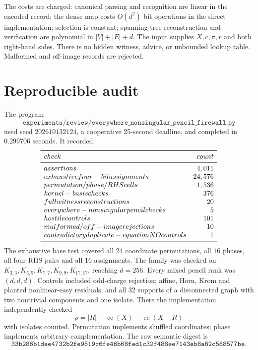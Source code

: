 \documentclass[11pt]{article}
\begin{document}
The costs are charged: canonical parsing and recognition are linear in the
encoded record; the dense map costs \(O(d^2)\) bit operations in the direct
implementation; selection is constant; spanning-tree reconstruction and
verification are polynomial in \(|V|+|E|+d\).  The input supplies
\(X,c,\pi,r\) and both right-hand sides.  There is no hidden witness, advice,
or unbounded lookup table.  Malformed and off-image records are rejected.

\section{Reproducible audit}
The program
\[
\texttt{experiments/review/everywhere\_nonsingular\_pencil\_firewall.py}
\]
used seed \(202610132124\), a cooperative 25-second deadline, and completed
in \(0.299706\) seconds.  It recorded:
\[
\begin{array}{lr}
\toprule
check & count\\
\midrule
assertions & 4,011\\
exhaustive four-bit assignments & 24,576\\
permutation/phase/RHS cells & 1,536\\
kernel-basis checks & 376\\
full witness reconstructions & 20\\
everywhere-nonsingular pencil checks & 5\\
hostile controls & 101\\
malformed/off-image rejections & 10\\
contradictory duplicate-equation NO controls & 1\\
\bottomrule
\end{array}
\]
The exhaustive base test covered all \(24\) coordinate permutations, all
\(16\) phases, all four RHS pairs and all \(16\) assignments.  The family
was checked on \(K_{3,3},K_{5,5},K_{7,7},K_{9,9},K_{17,17}\), reaching
\(d=256\).  Every mixed pencil rank was \((d,d,d)\).  Controls included
odd-charge rejection; affine, Horn, Krom and planted nonlinear-easy
residuals; and all 32 supports of a disconnected graph with two nontrivial
components and one isolate.  There the implementation independently checked
\[
\rho=|R|+\operatorname{cc}(X)-\operatorname{cc}(X-R)             \tag{9}
\]
with isolates counted.  Permutation implements shuffled coordinates; phase
implements arbitrary complementation.  The raw semantic digest is
\[
\texttt{33b286b1dee4732b2fe9519c6fe46b68fed1c32f488ee7143eb8a62c588577be}.
\]
\end{document}
